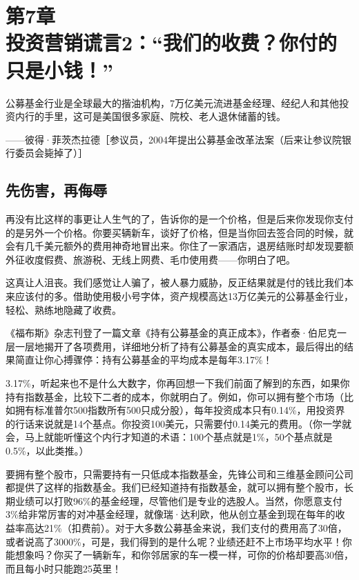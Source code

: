 
\section[第7章\q 投资营销谎言2：“我们的收费？你付的只是小钱！”]{第7章\\ 投资营销谎言2：“我们的收费？你付的只是小钱！”}

\begin{BookQuote}
公募基金行业是全球最大的揩油机构，7万亿美元流进基金经理、经纪人和其他投资内行的手里，这可是美国很多家庭、院校、老人退休储蓄的钱。

\hfill ——彼得·菲茨杰拉德［参议员，2004年提出公募基金改革法案（后来让参议院银行委员会毙掉了）］
\end{BookQuote}


\subsection{先伤害，再侮辱}

再没有比这样的事更让人生气的了，告诉你的是一个价格，但是后来你发现你支付的是另外一个价格。你要买辆新车，谈好了价格，但是当你回去签合同的时候，就会有几千美元额外的费用神奇地冒出来。你住了一家酒店，退房结账时却发现要额外征收度假费、旅游税、无线上网费、毛巾使用费——你明白了吧。

这真让人沮丧。我们感觉让人骗了，被人暴力威胁，反正结果就是付的钱比我们本来应该付的多。借助使用极小号字体，资产规模高达13万亿美元的公募基金行业，轻松、熟练地隐藏了收费。

《福布斯》杂志刊登了一篇文章《持有公募基金的真正成本》，作者泰·伯尼克一层一层地揭开了各项费用，详细地分析了持有公募基金的真实成本，最后得出的结果简直让你心搏骤停：持有公募基金的平均成本是每年3.17\%！

3.17\%，听起来也不是什么大数字，你再回想一下我们前面了解到的东西，如果你持有指数基金，比较下二者的成本，你就明白了。例如，你可以拥有整个市场（比如拥有标准普尔500指数所有500只成分股），每年投资成本只有0.14\%，用投资界的行话来说就是14个基点。你投资100美元，只需要付0.14美元的费用。（你一学就会，马上就能听懂这个内行才知道的术语：100个基点就是1\%，50个基点就是0.5\%，以此类推。）

要拥有整个股市，只需要持有一只低成本指数基金，先锋公司和三维基金顾问公司都提供了这样的指数基金。我们已经知道持有指数基金，就可以拥有整个股市，长期业绩可以打败96\%的基金经理，尽管他们是专业的选股人。当然，你愿意支付3\%给非常厉害的对冲基金经理，就像瑞·达利欧，他从创立基金到现在每年的收益率高达21\%（扣费前）。对于大多数公募基金来说，我们支付的费用高了30倍，或者说高了3000\%，可是，我们得到的是什么呢？业绩还赶不上市场平均水平！你能想象吗？你买了一辆新车，和你邻居家的车一模一样，可你的价格却要高30倍，而且每小时只能跑25英里！

